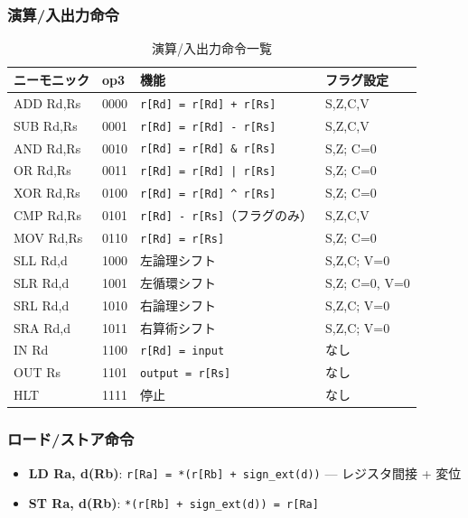 \documentclass[a4paper,11pt]{ltjsarticle}
\begin{document}
\subsubsection{演算/入出力命令}

\begin{table}[h]
\centering
\caption{演算/入出力命令一覧}
\label{tab:alu_ops}
\begin{tabular}{llll}
\toprule
ニーモニック & op3 & 機能 & フラグ設定 \\
\midrule
ADD Rd,Rs & 0000 & \texttt{r[Rd] = r[Rd] + r[Rs]}         & S,Z,C,V \\
SUB Rd,Rs & 0001 & \texttt{r[Rd] = r[Rd] - r[Rs]}         & S,Z,C,V \\
AND Rd,Rs & 0010 & \texttt{r[Rd] = r[Rd] \& r[Rs]}        & S,Z; C=0 \\
OR  Rd,Rs & 0011 & \texttt{r[Rd] = r[Rd] | r[Rs]}         & S,Z; C=0 \\
XOR Rd,Rs & 0100 & \texttt{r[Rd] = r[Rd] \^{} r[Rs]}      & S,Z; C=0 \\
CMP Rd,Rs & 0101 & \texttt{r[Rd] - r[Rs]}（フラグのみ）   & S,Z,C,V \\
MOV Rd,Rs & 0110 & \texttt{r[Rd] = r[Rs]}                  & S,Z; C=0 \\
SLL Rd,d  & 1000 & 左論理シフト                             & S,Z,C; V=0 \\
SLR Rd,d  & 1001 & 左循環シフト                             & S,Z; C=0, V=0 \\
SRL Rd,d  & 1010 & 右論理シフト                             & S,Z,C; V=0 \\
SRA Rd,d  & 1011 & 右算術シフト                             & S,Z,C; V=0 \\
IN  Rd    & 1100 & \texttt{r[Rd] = input}                   & なし \\
OUT Rs    & 1101 & \texttt{output = r[Rs]}                  & なし \\
HLT       & 1111 & 停止                                     & なし \\
\bottomrule
\end{tabular}
\end{table}

\subsubsection{ロード/ストア命令}

\begin{itemize}
\item \textbf{LD Ra, d(Rb)}: \texttt{r[Ra] = *(r[Rb] + sign\_ext(d))} — レジスタ間接 + 変位
\item \textbf{ST Ra, d(Rb)}: \texttt{*(r[Rb] + sign\_ext(d)) = r[Ra]}
\end{itemize}
\end{document}
